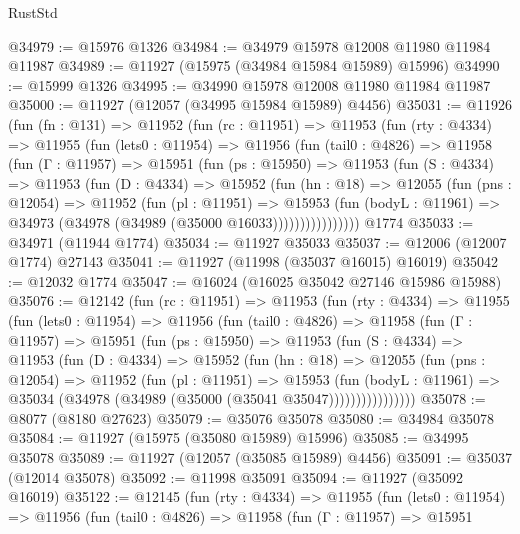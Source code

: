 \begin{lexlean}{RustStd}
\begin{coremodule}
@34979 := @15976 @1326
@34984 := @34979 @15978 @12008 @11980 @11984 @11987
@34989 := @11927 (@15975 (@34984 @15984 @15989) @15996)
@34990 := @15999 @1326
@34995 := @34990 @15978 @12008 @11980 @11984 @11987
@35000 := @11927 (@12057 (@34995 @15984 @15989) @4456)
@35031 := @11926
    (fun (fn : @131) =>
    @11952
      (fun (rc : @11951) =>
      @11953
        (fun (rty : @4334) =>
        @11955
          (fun (lets0 : @11954) =>
          @11956
            (fun (tail0 : @4826) =>
            @11958
              (fun (Γ : @11957) =>
              @15951
                (fun (ps : @15950) =>
                @11953
                  (fun (S : @4334) =>
                  @11953
                    (fun (D : @4334) =>
                    @15952
                      (fun (hn : @18) =>
                      @12055
                        (fun (pns : @12054) =>
                        @11952
                          (fun (pl : @11951) =>
                          @15953
                            (fun (bodyL : @11961) =>
                            @34973 (@34978 (@34989 (@35000 @16033))))))))))))))))
    @1774
@35033 := @34971 (@11944 @1774)
@35034 := @11927 @35033
@35037 := @12006 (@12007 @1774) @27143
@35041 := @11927 (@11998 (@35037 @16015) @16019)
@35042 := @12032 @1774
@35047 := @16024 (@16025 @35042 @27146 @15986 @15988)
@35076 := @12142
    (fun (rc : @11951) =>
    @11953
      (fun (rty : @4334) =>
      @11955
        (fun (lets0 : @11954) =>
        @11956
          (fun (tail0 : @4826) =>
          @11958
            (fun (Γ : @11957) =>
            @15951
              (fun (ps : @15950) =>
              @11953
                (fun (S : @4334) =>
                @11953
                  (fun (D : @4334) =>
                  @15952
                    (fun (hn : @18) =>
                    @12055
                      (fun (pns : @12054) =>
                      @11952
                        (fun (pl : @11951) =>
                        @15953
                          (fun (bodyL : @11961) =>
                          @35034 (@34978 (@34989 (@35000 (@35041 @35047))))))))))))))))
@35078 := @8077 (@8180 @27623)
@35079 := @35076 @35078
@35080 := @34984 @35078
@35084 := @11927 (@15975 (@35080 @15989) @15996)
@35085 := @34995 @35078
@35089 := @11927 (@12057 (@35085 @15989) @4456)
@35091 := @35037 (@12014 @35078)
@35092 := @11998 @35091
@35094 := @11927 (@35092 @16019)
@35122 := @12145
    (fun (rty : @4334) =>
    @11955
      (fun (lets0 : @11954) =>
      @11956
        (fun (tail0 : @4826) =>
        @11958
          (fun (Γ : @11957) =>
          @15951

\end{coremodule}
\end{lexlean}
